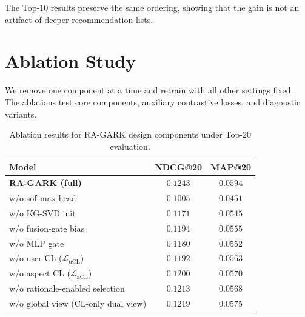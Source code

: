 The Top-10 results preserve the same ordering, showing that the gain is not an artifact of deeper recommendation lists.

\section{Ablation Study}
\label{sec:eval-ablation}
\label{sec:ablation-svd}
\label{sec:ablation-softmax}
\label{sec:ablation-gate}

We remove one component at a time and retrain with all other settings fixed. The ablations test core components, auxiliary contrastive losses, and diagnostic variants.

\begin{table}[H]
\centering
\caption{Ablation results for RA-GARK design components under Top-20 evaluation.}
\label{tab:ablation@20}
\begin{tabular}{lcc}
\toprule
Model & NDCG@20 & MAP@20 \\
\midrule
\textbf{RA-GARK (full)}              & $\mathbf{0.1243}$ & $\mathbf{0.0594}$ \\
\midrule
w/o softmax head                     & $0.1005$ & $0.0451$ \\
w/o KG-SVD init                      & $0.1171$ & $0.0545$ \\
w/o fusion-gate bias                 & $0.1194$ & $0.0555$ \\
w/o MLP gate                         & $0.1180$ & $0.0552$ \\
\midrule
w/o user CL ($\mathcal{L}_{\mathrm{uCL}}$)  & $0.1192$ & $0.0563$ \\
w/o aspect CL ($\mathcal{L}_{\mathrm{aCL}}$) & $0.1200$ & $0.0570$ \\
\midrule
w/o rationale-enabled selection      & $0.1213$ & $0.0568$ \\
w/o global view (CL-only dual view)  & $0.1219$ & $0.0575$ \\
\bottomrule
\end{tabular}
\end{table}

